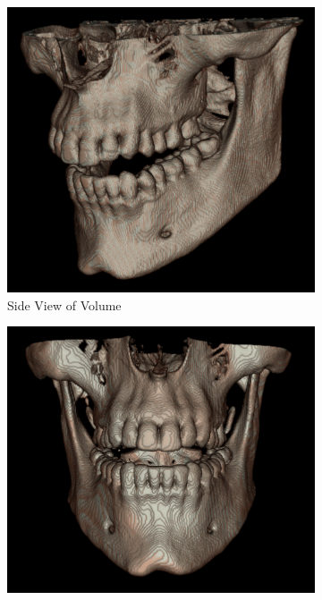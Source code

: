 \documentclass[11.5pt, b5paper]{article}
\begin{document}
\begin{figure}
    \centering
    \begin{subfigure}[b]{0.33\textwidth}
        \centering
        \includegraphics[width=\textwidth]{BSS}
        \caption{Side View of Volume}
    \end{subfigure}
    \hfill
    \begin{subfigure}[b]{0.33\textwidth}
        \centering
        \includegraphics[width=\textwidth]{BSF}

\end{subfigure}
\end{figure}
\end{document}
